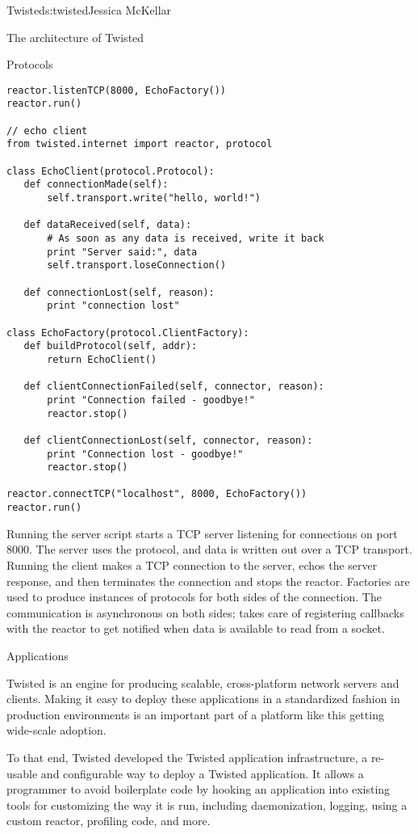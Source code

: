 \begin{aosachapter}{Twisted}{s:twisted}{Jessica McKellar}
\begin{aosasect1}{The architecture of Twisted}
\begin{aosasect2}{Protocols}
\begin{verbatim}
reactor.listenTCP(8000, EchoFactory())
reactor.run()

// echo client
from twisted.internet import reactor, protocol

class EchoClient(protocol.Protocol):
   def connectionMade(self):
       self.transport.write("hello, world!")

   def dataReceived(self, data):
       # As soon as any data is received, write it back
       print "Server said:", data
       self.transport.loseConnection()

   def connectionLost(self, reason):
       print "connection lost"

class EchoFactory(protocol.ClientFactory):
   def buildProtocol(self, addr):
       return EchoClient()

   def clientConnectionFailed(self, connector, reason):
       print "Connection failed - goodbye!"
       reactor.stop()

   def clientConnectionLost(self, connector, reason):
       print "Connection lost - goodbye!"
       reactor.stop()

reactor.connectTCP("localhost", 8000, EchoFactory())
reactor.run()
\end{verbatim}

Running the server script starts a TCP server listening for connections on
port 8000. The server uses the  protocol, and data is written
out over a TCP transport. Running the client makes a TCP connection to the
server, echos the server response, and then terminates the connection and stops
the reactor. Factories are used to produce instances of protocols for both sides
of the connection. The communication is asynchronous on both sides;
 takes care of registering callbacks with the reactor to
get notified when data is available to read from a socket.

\end{aosasect2}

\begin{aosasect2}{Applications}

Twisted is an engine for producing scalable, cross-platform network servers
and clients. Making it easy to deploy these applications in a standardized
fashion in production environments is an important part of a platform like this
getting wide-scale adoption.

To that end, Twisted developed the Twisted application infrastructure, a
re-usable and configurable way to deploy a Twisted application. It allows a
programmer to avoid boilerplate code by hooking an application into existing
tools for customizing the way it is run, including daemonization, logging, using
a custom reactor, profiling code, and more.


\end{aosasect2}
\end{aosasect1}
\end{aosachapter}
